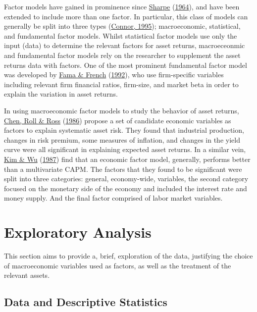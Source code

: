 \documentclass[11pt,preprint, authoryear]{elsarticle}
\numberwithin{equation}{section}
\numberwithin{figure}{section}
\numberwithin{table}{section}
\begin{document}
Factor models have gained in prominence since
\protect\hyperlink{ref-Sharpe1964}{Sharpe}
(\protect\hyperlink{ref-Sharpe1964}{1964}), and have been extended to
include more than one factor. In particular, this class of models can
generally be split into three types
(\protect\hyperlink{ref-Connor}{Connor, 1995}); macroeconomic,
statistical, and fundamental factor models. Whilst statistical factor
models use only the input (data) to determine the relevant factors for
asset returns, macroeceonmic and fundamental factor models rely on the
researcher to supplement the asset returns data with factors. One of the
most prominent fundamental factor model was developed by
\protect\hyperlink{ref-Fama1992}{Fama \& French}
(\protect\hyperlink{ref-Fama1992}{1992}), who use firm-specific
variables including relevant firm financial ratios, firm-size, and
market beta in order to explain the variation in asset returns.

In using macroeconomic factor models to study the behavior of asset
returns, \protect\hyperlink{ref-Chen1986}{Chen, Roll \& Ross}
(\protect\hyperlink{ref-Chen1986}{1986}) propose a set of candidate
economic variables as factors to explain systematic asset risk. They
found that industrial production, changes in risk premium, some measures
of inflation, and changes in the yield curve were all significant in
explaining expected asset returns. In a similar vein,
\protect\hyperlink{ref-Kim1987}{Kim \& Wu}
(\protect\hyperlink{ref-Kim1987}{1987}) find that an economic factor
model, generally, performs better than a multivariate CAPM. The factors
that they found to be significant were split into three categories:
general, economy-wide, variables, the second category focused on the
monetary side of the economy and included the interest rate and money
supply. And the final factor comprised of labor market variables.

\newpage

\hypertarget{exploratory-analysis}{%
\section{\texorpdfstring{Exploratory Analysis
\label{Explor}}{Exploratory Analysis }}\label{exploratory-analysis}}

This section aims to provide a, brief, exploration of the data,
justifying the choice of macroeconomic variables used as factors, as
well as the treatment of the relevant assets.

\hypertarget{data-and-descriptive-statistics}{%
\subsection{Data and Descriptive
Statistics}\label{data-and-descriptive-statistics}}
\end{document}
